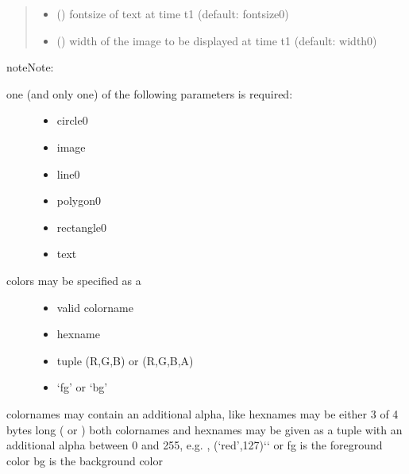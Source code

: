 \documentclass[letterpaper,10pt,english]{sphinxmanual}
\begin{document}
\begin{fulllineitems}
\begin{quote}
\begin{description}
\begin{itemize}
\item {} 
 () \textendash{} fontsize of text at time t1 (default: fontsize0)

\item {} 
 () \textendash{} width of the image to be displayed at time t1 (default: width0) 

\end{itemize}

\end{description}\end{quote}

\begin{sphinxadmonition}{note}{Note:}\begin{description}
\item[{one (and only one) of the following parameters is required:}] \leavevmode\begin{itemize}
\item {} 
circle0

\item {} 
image

\item {} 
line0

\item {} 
polygon0

\item {} 
rectangle0

\item {} 
text

\end{itemize}

\item[{colors may be specified as a}] \leavevmode\begin{itemize}
\item {} 
valid colorname

\item {} 
hexname

\item {} 
tuple (R,G,B) or (R,G,B,A)

\item {} 
‘fg’ or ‘bg’

\end{itemize}

\end{description}

colornames may contain an additional alpha, like  
hexnames may be either 3 of 4 bytes long ( or ) 
both colornames and hexnames may be given as a tuple with an
additional alpha between 0 and 255,
e.g. , (‘red’,127){}`{}` or  
fg is the foreground color 
bg is the background color 


\end{sphinxadmonition}
\end{fulllineitems}
\end{document}
